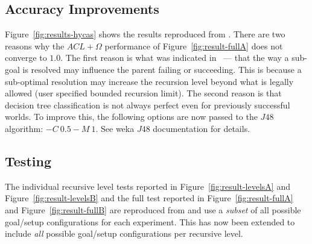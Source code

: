 \documentclass[a4paper]{article}
\begin{document}
\begin{figure*}[t]
\begin{center}
\qquad
{}
\qquad
{}
\qquad
{}
\caption{Agent performance under $ACL$ and $ACL+\Omega$ schemes. Each point represents results from $5$ experiment runs using an averaging window of $100$ samples. Reproduced from \cite{Singh:HYCAS10}.}
\label{fig:results-hycas}
\end{center}
\end{figure*}


\subsection{Accuracy Improvements}


Figure~\ref{fig:results-hycas} shows the results reproduced from \cite{Singh:HYCAS10}. There are two reasons why the $ACL+\Omega$ performance of Figure~\ref{fig:result-fullA} does not converge to $1.0$. The first reason is what was indicated in~\cite{Singh:HYCAS10} --- that the way a sub-goal is resolved may influence the parent failing or succeeding. This is because a sub-optimal resolution may increase the recursion level beyond what is legally allowed (user specified bounded recursion limit). The second reason is that decision tree classification is not always perfect even for previously successful worlds. To improve this, the following options are now passed to the $J48$ algorithm: $-C~0.5 -M~1$. See weka $J48$ documentation for details.


\subsection{Testing}

The individual recursive level tests reported in Figure~\ref{fig:result-levelsA} and Figure~\ref{fig:result-levelsB} and the full test reported in Figure~\ref{fig:result-fullA} and Figure~\ref{fig:result-fullB} are reproduced from \cite{Singh:HYCAS10} and use a \textit{subset} of all possible goal/setup configurations for each experiment. This has now been extended to include \textit{all} possible goal/setup configurations per recursive level.
\end{document}
